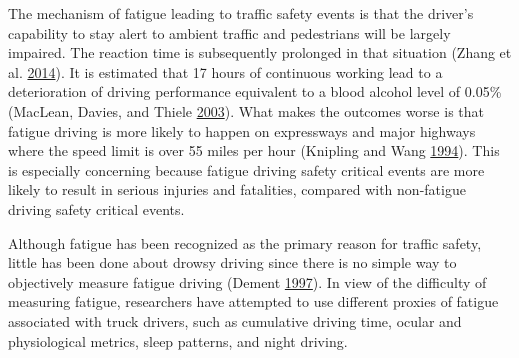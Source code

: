 \documentclass[12pt]{book}
\numberwithin{equation}{chapter}
\begin{document}
The mechanism of fatigue leading to traffic safety events is that the driver's capability to stay alert to ambient traffic and pedestrians will be largely impaired. The reaction time is subsequently prolonged in that situation (Zhang et al. \protect\hyperlink{ref-zhang2014study}{2014}). It is estimated that 17 hours of continuous working lead to a deterioration of driving performance equivalent to a blood alcohol level of 0.05\% (MacLean, Davies, and Thiele \protect\hyperlink{ref-maclean2003hazards}{2003}). What makes the outcomes worse is that fatigue driving is more likely to happen on expressways and major highways where the speed limit is over 55 miles per hour (Knipling and Wang \protect\hyperlink{ref-knipling1994crashes}{1994}). This is especially concerning because fatigue driving safety critical events are more likely to result in serious injuries and fatalities, compared with non-fatigue driving safety critical events.

Although fatigue has been recognized as the primary reason for traffic safety, little has been done about drowsy driving since there is no simple way to objectively measure fatigue driving (Dement \protect\hyperlink{ref-dement1997perils}{1997}). In view of the difficulty of measuring fatigue, researchers have attempted to use different proxies of fatigue associated with truck drivers, such as cumulative driving time, ocular and physiological metrics, sleep patterns, and night driving.
\end{document}
